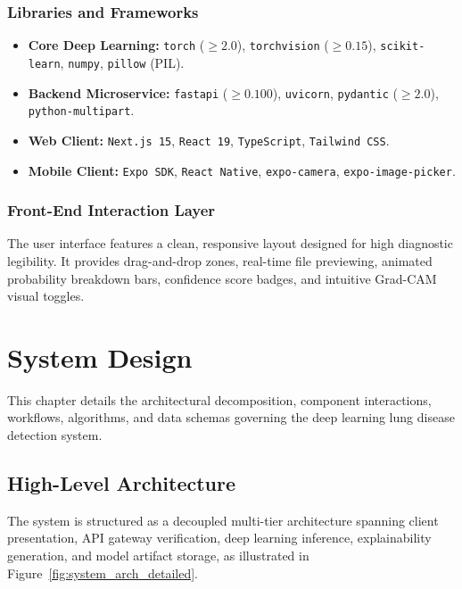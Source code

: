 \documentclass[12pt,a4paper]{report}
\begin{document}
\subsection{Libraries and Frameworks}
\begin{itemize}
    \item \textbf{Core Deep Learning:} \texttt{torch} ($\ge 2.0$), \texttt{torchvision} ($\ge 0.15$), \texttt{scikit-learn}, \texttt{numpy}, \texttt{pillow} (PIL).
    \item \textbf{Backend Microservice:} \texttt{fastapi} ($\ge 0.100$), \texttt{uvicorn}, \texttt{pydantic} ($\ge 2.0$), \texttt{python-multipart}.
    \item \textbf{Web Client:} \texttt{Next.js 15}, \texttt{React 19}, \texttt{TypeScript}, \texttt{Tailwind CSS}.
    \item \textbf{Mobile Client:} \texttt{Expo SDK}, \texttt{React Native}, \texttt{expo-camera}, \texttt{expo-image-picker}.
\end{itemize}

\subsection{Front-End Interaction Layer}
The user interface features a clean, responsive layout designed for high diagnostic legibility. It provides drag-and-drop zones, real-time file previewing, animated probability breakdown bars, confidence score badges, and intuitive Grad-CAM visual toggles.


\chapter{System Design}

This chapter details the architectural decomposition, component interactions, workflows, algorithms, and data schemas governing the deep learning lung disease detection system.

\section{High-Level Architecture}
The system is structured as a decoupled multi-tier architecture spanning client presentation, API gateway verification, deep learning inference, explainability generation, and model artifact storage, as illustrated in Figure~\ref{fig:system_arch_detailed}.
\end{document}
